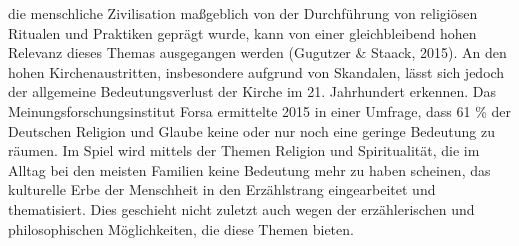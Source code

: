 \documentclass[
  a4paper,
  DIV=11,
  numbers=noendperiod,
  onecolumn,
  oneside,
  a4paper]{scrartcl}
\begin{document}
die menschliche Zivilisation maßgeblich von der Durchführung von
religiösen Ritualen und Praktiken geprägt wurde, kann von einer
gleichbleibend hohen Relevanz dieses Themas ausgegangen werden (Gugutzer
\& Staack, 2015). An den hohen Kirchenaustritten, insbesondere aufgrund
von Skandalen, lässt sich jedoch der allgemeine Bedeutungsverlust der
Kirche im 21. Jahrhundert erkennen. Das Meinungsforschungsinstitut Forsa
ermittelte 2015 in einer Umfrage, dass 61 \% der Deutschen Religion und
Glaube keine oder nur noch eine geringe Bedeutung zu räumen. Im Spiel
wird mittels der Themen Religion und Spiritualität, die im Alltag bei
den meisten Familien keine Bedeutung mehr zu haben scheinen, das
kulturelle Erbe der Menschheit in den Erzählstrang eingearbeitet und
thematisiert. Dies geschieht nicht zuletzt auch wegen der erzählerischen
und philosophischen Möglichkeiten, die diese Themen bieten.
\end{document}
